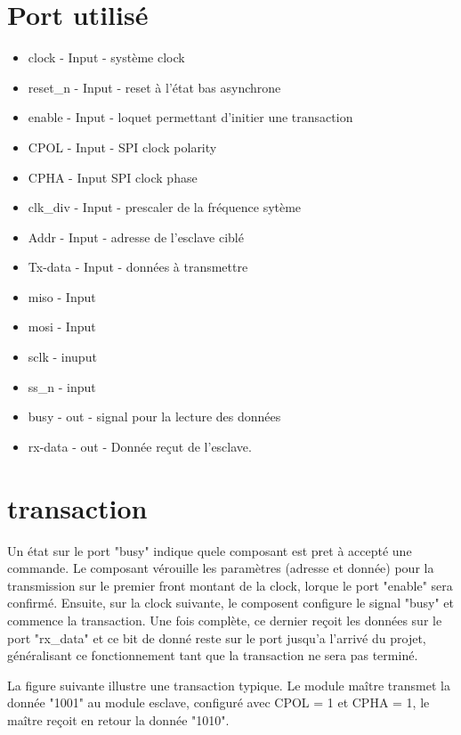 \documentclass[french,a4paper,12pt]{report}
\begin{document}
	\section{Port utilisé}
		\begin{itemize}
			\item clock - Input - système clock
			\item reset\_n - Input - reset à l'état bas asynchrone
			\item enable - Input - loquet permettant d'initier une transaction
			\item CPOL - Input - SPI clock polarity
			\item CPHA - Input SPI clock phase
			\item clk\_div - Input - prescaler de la fréquence sytème
			\item Addr - Input - adresse de l'esclave ciblé
			\item Tx-data - Input - données à transmettre
			\item miso - Input
			\item mosi - Input
			\item sclk - inuput
			\item  ss\_n - input
			\item busy - out - signal pour la lecture des données
			\item rx-data - out - Donnée reçut de l'esclave.
		\end{itemize}
	
	\section{transaction}
		Un état sur le port "busy" indique quele composant est pret à accepté une commande. Le composant vérouille les paramètres (adresse et donnée) pour la transmission sur le premier front montant de la clock, lorque le port "enable" sera confirmé. Ensuite, sur la clock suivante, le composent configure le signal "busy" et commence la transaction. Une fois complète, ce dernier reçoit les données sur le port "rx\_data" et ce bit de donné reste sur le port jusqu'a l'arrivé du projet, généralisant ce fonctionnement tant que la transaction ne sera pas terminé.		
		
		La figure suivante illustre une transaction typique. Le module maître transmet la donnée "1001" au module esclave, configuré avec CPOL = 1 et CPHA = 1, le maître reçoit en retour la donnée "1010".
		
\end{document}

